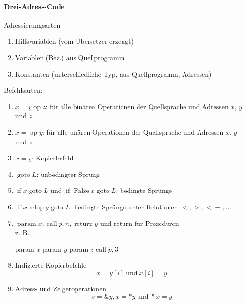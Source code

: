 \paragraph*{Drei-Adress-Code}
Adressierungsarten:
\begin{enumerate}
 \item Hilfsvariablen (vom Übersetzer erzeugt)
 \item Variablen (Bez.) aus Quellprogramm
 \item Konstanten (unterschiedliche Typ, aus Quellprogramm, Adressen)
\end{enumerate}
Befehlsarten:
\begin{enumerate}
 \item $x = y \operatorname{op} z$: für alle binären Operationen der Quellsprache und Adressen $x$, $y$ und $z$
 \item $x = \operatorname{op} y$: für alle unären Operationen der Quellsprache und Adressen $x$, $y$ und $z$
 \item $x = y$: Kopierbefehl
 \item $\operatorname{goto} L$: unbedingter Sprung
 \item $\operatorname{if} x \operatorname{goto} L$ und $\operatorname{if} \operatorname{False} x \operatorname{goto} L$: bedingte Sprünge
 \item $\operatorname{if} x \operatorname{relop} y \operatorname{goto} L$: bedingte Sprünge unter Relationen $<, >, <=, ...$
 \item $\operatorname{param} x, \operatorname{call} p, n, \operatorname{return} y$ und return für Prozeduren\\
          z. B.
          \begin{algorithmic}
           \STATE param $x$
           \STATE param $y$
           \STATE param $z$
           \STATE call $p, 3$
          \end{algorithmic}
 \item Indizierte Kopierbefehle
     \[x = y[i] \operatorname{und} x[i] = y\]
 \item Adress- und Zeigeroperationen
     \[x = \&y, x = *y \operatorname{und} *x = y\]
\end{enumerate}



